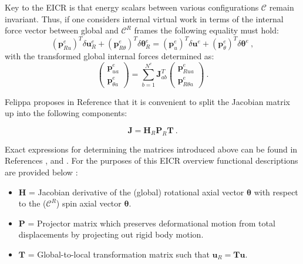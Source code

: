 Key to the EICR is that energy scalars between various configurations $\mathscr{C}$ remain invariant. Thus, if one considers internal virtual work in terms of the internal force vector between global and $\mathscr{C}^R$ frames the following equality must hold:
\begin{equation} 
(\mathbf{p}_{Ru}^{e})^T  \delta \mathbf{u}_{R}^e +
(\mathbf{p}_{R\theta}^{e})^T \delta \boldsymbol{\theta}_{R}^e =
(\mathbf{p}_{u}^{e})^T  \delta \mathbf{u}_{}^e +
(\mathbf{p}_{\theta}^{e})^T \delta \boldsymbol{\theta}_{}^e
\label{eq_cr7}\ ,
\end{equation}
with the transformed global internal forces determined as:
\begin{equation} 
\begin{pmatrix}
\mathbf{p}_{ua}^e \\
\mathbf{p}_{\theta a}^e 
\end{pmatrix}
=
\sum_{b=1}^{N^e}
\mathbf{J}_{ab}^T
\begin{pmatrix}
\mathbf{p}_{Rua}^e \\
\mathbf{p}_{R\theta a}^e 
\end{pmatrix}
\label{eq_cr8}\ .
\end{equation}

Felippa proposes in Reference \cite{felippa2005unified} that it is convenient to split the Jacobian matrix up into the following components:

\begin{equation} 
\mathbf{J}
= \mathbf{H}_R 
\mathbf{P}_R 
\mathbf{T}
\label{eq_cr9}\ .
\end{equation}

Exact expressions for determining the matrices introduced above can be found in References \cite{felippa2005unified}, \cite{felippa2000systematic} and \cite{FelippaCR1_2016}. For the purposes of this EICR overview functional descriptions are provided below \cite{felippa2005unified}:

\begin{itemize}
	\item $\mathbf{H}$ = Jacobian derivative of the (global) rotational axial vector $\boldsymbol{\theta}$ with respect to the ($\mathscr{C}^R$) spin axial vector $\boldsymbol{\theta}$.
	\item $\mathbf{P}$ = Projector matrix which preserves deformational motion from total displacements by projecting out rigid body motion.
	\item $\mathbf{T}$ = Global-to-local transformation matrix such that $\mathbf{u}_R = \mathbf{T} \mathbf{u}$.
\end{itemize}


